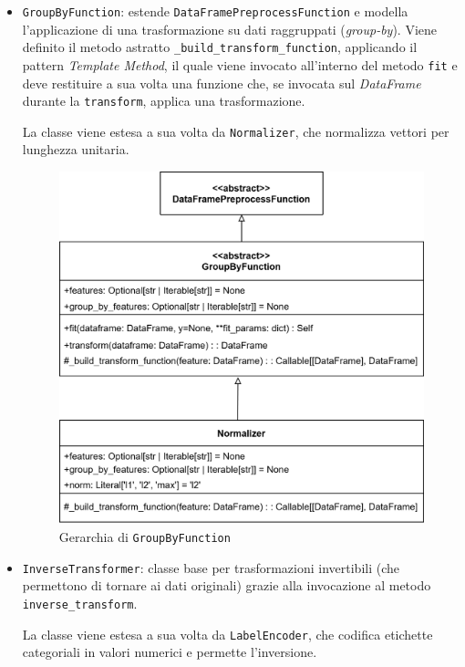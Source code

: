\begin{itemize}
    \item \texttt{GroupByFunction}: estende \texttt{DataFramePreprocessFunction} e modella l'applicazione di una trasformazione su dati raggruppati (\textit{group-by}). Viene definito il metodo astratto \texttt{\_build\_transform\_function}, applicando il pattern \textit{Template Method}, il quale viene invocato all'interno del metodo \texttt{fit} e deve restituire a sua volta una funzione che, se invocata sul \textit{DataFrame} durante la \texttt{transform}, applica una trasformazione.
    
    La classe viene estesa a sua volta da \texttt{Normalizer}, che normalizza vettori per lunghezza unitaria.

    \begin{figure}[H]
        \centering
        \includegraphics[scale=0.2]{figures/UML/preprocessing/group_by.png}
        \caption{Gerarchia di \texttt{GroupByFunction}}
    \end{figure}

    \item \texttt{InverseTransformer}: classe base per trasformazioni invertibili (che permettono di tornare ai dati originali) grazie alla invocazione al metodo \texttt{inverse\_transform}.
    
    La classe viene estesa a sua volta da \texttt{LabelEncoder}, che codifica etichette categoriali in valori numerici e permette l'inversione.
    

\end{itemize}
